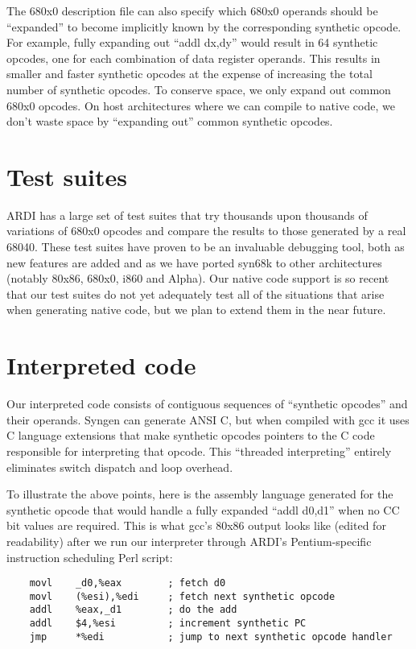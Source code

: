 The 680x0 description file can also specify which 680x0 operands
should be ``expanded'' to become implicitly known by the corresponding
synthetic opcode.  For example, fully expanding out ``addl dx,dy''
would result in 64 synthetic opcodes, one for each combination of
data register operands.  This results in smaller and faster synthetic
opcodes at the expense of increasing the total number of synthetic
opcodes.  To conserve space, we only expand out common 680x0 opcodes.
On host architectures where we can compile to native code, we don't
waste space by ``expanding out'' common synthetic opcodes.

\section{Test suites}

ARDI has a large set of test suites that try thousands upon thousands
of variations of 680x0 opcodes and compare the results to those
generated by a real 68040.  These test suites have proven to be an
invaluable debugging tool, both as new features are added and as
we have ported syn68k to other architectures (notably 80x86, 680x0,
i860 and Alpha).  Our native code support is so recent that our
test suites do not yet adequately test all of the situations that
arise when generating native code, but we plan to extend them in
the near future.

\section{Interpreted code}

Our interpreted code consists of contiguous sequences of ``synthetic
opcodes'' and their operands.  Syngen can generate ANSI C, but when
compiled with gcc it uses C language extensions that make synthetic
opcodes pointers to the C code responsible for interpreting that
opcode.  This ``threaded interpreting'' entirely eliminates switch
dispatch and loop overhead.

To illustrate the above points, here is the assembly language
generated for the synthetic opcode that would handle a fully expanded
``addl d0,d1'' when no CC bit values are required.  This is what
gcc's 80x86 output looks like (edited for readability) after we
run our interpreter through ARDI's Pentium-specific instruction
scheduling Perl script:

\begin{verbatim}
	movl    _d0,%eax        ; fetch d0
	movl    (%esi),%edi     ; fetch next synthetic opcode
	addl    %eax,_d1        ; do the add
	addl    $4,%esi         ; increment synthetic PC
	jmp     *%edi           ; jump to next synthetic opcode handler
\end{verbatim}

